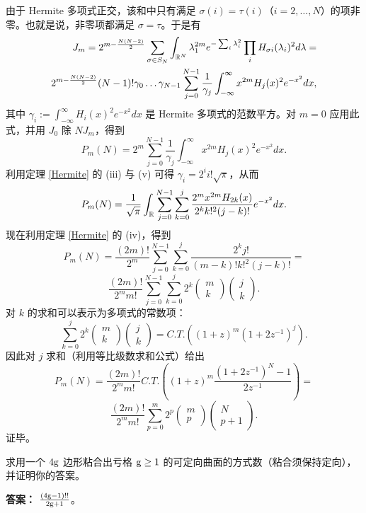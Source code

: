 由于 Hermite 多项式正交，该和中只有满足 $\sigma(i)=\tau(i)$（$i=2, \ldots ,N$）的项非零。也就是说，非零项都满足 $\sigma=\tau$。于是有
\begin{equation}
\begin{aligned}
J_m=2^{m-{N(N-2)\over 2}}\sum_{\sigma\in S_N}
\int_{\Bbb R^N}\lambda_1^{2m}
e^{-\sum_i \lambda_i^2}
\prod_i H_{\sigma i}(\lambda_i)^2d\lambda=\\
2^{m-{N(N-2)\over 2}}(N-1)!\gamma_0 \ldots \gamma_{N-1}\sum_{j=0}^{N-1}
\frac{1}{\gamma_j}\int_{-\infty}^\infty x^{2m}H_j(x)^2e^{-x^2}dx,
\end{aligned}
\end{equation}
其中 $\gamma_i:=\int_{-\infty}^\infty H_i(x)^2e^{-x^2}dx$ 
是 Hermite 多项式的范数平方。对 $m=0$ 应用此式，并用 $J_0$ 除 $NJ_m$，得到
$$
P_m(N)=2^m\sum_{j=0}^{N-1}
\frac{1}{\gamma_j}\int_{-\infty}^\infty x^{2m}H_j(x)^2e^{-x^2}dx.
$$
利用定理 \ref{Hermite} 的 (iii) 与 (v) 可得
$\gamma_i=2^ii!\sqrt{\pi}$，从而
$$
P_m(N)=\frac{1}{\sqrt{\pi}}\int_{\Bbb R}\sum_{j=0}^{N-1}
\sum_{k=0}^j\frac{2^mx^{2m}H_{2k}(x)}{2^kk!^2(j-k)!}e^{-x^2}dx.
$$
现在利用定理 \ref{Hermite} 的 (iv)，得到
$$
P_m(N)=\frac{(2m)!}{2^m}\sum_{j=0}^{N-1}
\sum_{k=0}^j\frac{2^kj!}{(m-k)!k!^2(j-k)!}=
$$
$$
\frac{(2m)!}{2^mm!}\sum_{j=0}^{N-1}
\sum_{k=0}^j2^k\begin{pmatrix}m\\ k\end{pmatrix}
\begin{pmatrix}j\\ k\end{pmatrix}.
$$
对 $k$ 的求和可以表示为多项式的常数项：
$$
\sum_{k=0}^j2^k\begin{pmatrix}m\\ k\end{pmatrix}
\begin{pmatrix}j\\ k\end{pmatrix}=
C.T.((1+z)^m(1+2z^{-1})^j). 
$$
因此对 $j$ 求和（利用等比级数求和公式）给出
$$
P_m(N)=\frac{(2m)!}{2^mm!}
C.T.\left((1+z)^m\frac{(1+2z^{-1})^N-1}{2z^{-1}}\right)=
$$
$$
\frac{(2m)!}{2^mm!}\sum_{p=0}^m2^p
\begin{pmatrix}m\\ p\end{pmatrix}
\begin{pmatrix}N\\ p+1\end{pmatrix}.
$$
证毕。

\begin{exercise} 求用一个 $4{\rm g}$ 边形粘合出亏格 ${\rm g}\ge 1$ 的可定向曲面的方式数（粘合须保持定向），并证明你的答案。

\textbf{答案：} $\frac{(4{\rm g}-1)!!}{2{\rm g}+1}$。
\end{exercise} 


